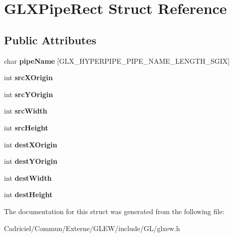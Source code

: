 \hypertarget{struct_g_l_x_pipe_rect}{}\section{G\+L\+X\+Pipe\+Rect Struct Reference}
\label{struct_g_l_x_pipe_rect}
\subsection*{Public Attributes}
\begin{DoxyCompactItemize}
\item 
char {\bfseries pipe\+Name} \mbox{[}G\+L\+X\+\_\+\+H\+Y\+P\+E\+R\+P\+I\+P\+E\+\_\+\+P\+I\+P\+E\+\_\+\+N\+A\+M\+E\+\_\+\+L\+E\+N\+G\+T\+H\+\_\+\+S\+G\+IX\mbox{]}\hypertarget{struct_g_l_x_pipe_rect_aa4c4f60e9647705ddefa10f95a37cb79}{}\label{struct_g_l_x_pipe_rect_aa4c4f60e9647705ddefa10f95a37cb79}

\item 
int {\bfseries src\+X\+Origin}\hypertarget{struct_g_l_x_pipe_rect_a9df2313c01f75d149e64f2ff467bc266}{}\label{struct_g_l_x_pipe_rect_a9df2313c01f75d149e64f2ff467bc266}

\item 
int {\bfseries src\+Y\+Origin}\hypertarget{struct_g_l_x_pipe_rect_a1f7316dff7050ab2ce9d3d37f8c5450e}{}\label{struct_g_l_x_pipe_rect_a1f7316dff7050ab2ce9d3d37f8c5450e}

\item 
int {\bfseries src\+Width}\hypertarget{struct_g_l_x_pipe_rect_a2c6c180a4dabb71076366e06a1c7d0ef}{}\label{struct_g_l_x_pipe_rect_a2c6c180a4dabb71076366e06a1c7d0ef}

\item 
int {\bfseries src\+Height}\hypertarget{struct_g_l_x_pipe_rect_a35632524bce6bffa05f284a9b1c1b8ff}{}\label{struct_g_l_x_pipe_rect_a35632524bce6bffa05f284a9b1c1b8ff}

\item 
int {\bfseries dest\+X\+Origin}\hypertarget{struct_g_l_x_pipe_rect_a8b7b941894ad3420326d7e9fa885bb71}{}\label{struct_g_l_x_pipe_rect_a8b7b941894ad3420326d7e9fa885bb71}

\item 
int {\bfseries dest\+Y\+Origin}\hypertarget{struct_g_l_x_pipe_rect_aef7766b02ef07c20a11e89da5878b469}{}\label{struct_g_l_x_pipe_rect_aef7766b02ef07c20a11e89da5878b469}

\item 
int {\bfseries dest\+Width}\hypertarget{struct_g_l_x_pipe_rect_a3c07991d2a8fb6e973eae834650b3dad}{}\label{struct_g_l_x_pipe_rect_a3c07991d2a8fb6e973eae834650b3dad}

\item 
int {\bfseries dest\+Height}\hypertarget{struct_g_l_x_pipe_rect_a858b0ea6642e451495aff35cfefbd083}{}\label{struct_g_l_x_pipe_rect_a858b0ea6642e451495aff35cfefbd083}

\end{DoxyCompactItemize}


The documentation for this struct was generated from the following file\+:\begin{DoxyCompactItemize}
\item 
Cadriciel/\+Commun/\+Externe/\+G\+L\+E\+W/include/\+G\+L/glxew.\+h\end{DoxyCompactItemize}
